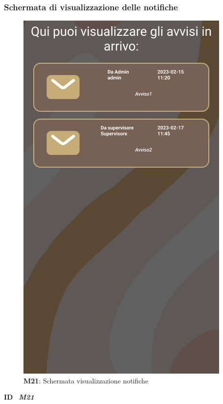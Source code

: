                     \subsubsection{Schermata di visualizzazione delle notifiche}
                      \begin{figure}[H]
                        \centering
                        \includegraphics[scale=0.4]{assets/Mockup/Mockup_Notifications.png}
                        \caption*{\textbf{M21}: Schermata visualizzazione notifiche}\label{fig:Mockup_Notifications}
                      \end{figure}

                      \begin{flushleft}
                        \textbf{ID}   \ \Large{\textit{\textbf{M21}}}
                      \end{flushleft}

